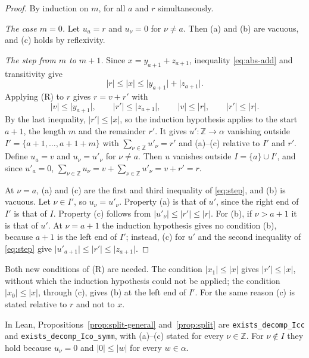 \documentclass[11pt]{article}
\theoremstyle{definition}
\theoremstyle{remark}
\newcommand{\abs}[1]{\lvert #1\rvert}
\newcommand{\Z}{\mathbb Z}
\begin{document}
\begin{proof}
  By induction on \(m\), for all \(a\) and \(r\) simultaneously.

  \emph{The case \(m = 0\).} Let \(u_a = r\) and \(u_\nu = 0\) for \(\nu \ne a\). Then
  (a) and (b) are vacuous, and (c) holds by reflexivity.

  \emph{The step from \(m\) to \(m+1\).} Since \(x = y_{a+1} + z_{a+1}\), inequality
  \eqref{eq:abs-add} and transitivity give
  \[
    \abs{r} \le \abs{x} \le \abs{y_{a+1}} + \abs{z_{a+1}} .
  \]
  Applying (R) to \(r\) gives \(r = v + r'\) with
  \begin{equation}\label{eq:step}
    \abs{v} \le \abs{y_{a+1}}, \qquad \abs{r'} \le \abs{z_{a+1}}, \qquad
    \abs{v} \le \abs{r}, \qquad \abs{r'} \le \abs{r}.
  \end{equation}
  By the last inequality, \(\abs{r'} \le \abs{x}\), so the induction hypothesis applies to
  the start \(a+1\), the length \(m\) and the remainder \(r'\). It gives
  \(u' \colon \Z \to \alpha\) vanishing outside \(I' = \{a+1, \dots, a+1+m\}\) with
  \(\sum_{\nu \in \Z} u'_\nu = r'\) and (a)--(c) relative to \(I'\) and \(r'\). Define
  \(u_a = v\) and \(u_\nu = u'_\nu\) for \(\nu \ne a\). Then \(u\) vanishes outside
  \(I = \{a\} \cup I'\), and since \(u'_a = 0\), \(\sum_{\nu \in \Z} u_\nu = v + \sum_{\nu \in \Z} u'_\nu = v + r' = r\).

  At \(\nu = a\), (a) and (c) are the first and third inequality of \eqref{eq:step}, and (b)
  is vacuous. Let \(\nu \in I'\), so \(u_\nu = u'_\nu\). Property (a) is that of \(u'\), since
  the right end of \(I'\) is that of \(I\). Property (c) follows from
  \(\abs{u'_\nu} \le \abs{r'} \le \abs{r}\). For (b), if \(\nu > a+1\) it is that of \(u'\).
  At \(\nu = a+1\) the induction hypothesis gives no condition (b), because \(a+1\) is the left
  end of \(I'\); instead, (c) for \(u'\) and the second inequality of \eqref{eq:step} give
  \(\abs{u'_{a+1}} \le \abs{r'} \le \abs{z_{a+1}}\).
\end{proof}

Both new conditions of (R) are needed. The condition \(\abs{x_1} \le \abs{x}\) gives
\(\abs{r'} \le \abs{x}\), without which the induction hypothesis could not be applied; the
condition \(\abs{x_0} \le \abs{x}\), through (c), gives (b) at the left end of \(I'\). For
the same reason (c) is stated relative to \(r\) and not to \(x\).

In Lean, Propositions~\ref{prop:split-general} and~\ref{prop:split} are
\texttt{exists\_decomp\_Icc} and \texttt{exists\_decomp\_Ico\_symm}, with (a)--(c) stated for
every \(\nu \in \Z\). For \(\nu \notin I\) they hold because \(u_\nu = 0\) and
\(\abs{0} \le \abs{w}\) for every \(w \in \alpha\).
\end{document}

